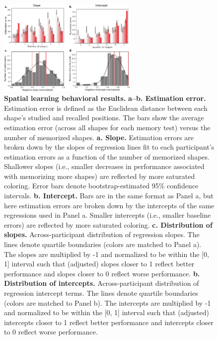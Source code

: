 \documentclass[10pt]{article}
\begin{document}
\begin{figure}[p]
\centering
\includegraphics[width=0.6\textwidth]{figs/spatial_learning_behavior}
\caption{\textbf{Spatial learning behavioral results.}
  \textbf{a--b. Estimation error.}  Estimation
  error is defined as the Euclidean distance between each shape's
  studied and recalled positions.  The bars show the average
  estimation error (across all shapes for each memory test) versus the
  number of memorized shapes.  \textbf{a. Slope.} Estimation errors
  are broken down by the slopes of regression lines fit to each
  participant's estimation errors as a function of the number of
  memorized shapes.  Shallower slopes (i.e., smaller decreases in
  performance associated with memorizing more shapes) are reflected by
  more saturated coloring.  Error bars denote bootstrap-estimated 95\%
  confidence intervals.  \textbf{b. Intercept.}  Bars are in the same
  format as Panel a, but here estimation errors are
  broken down by the intercepts of the same regressions used in Panel
  a.  Smaller intercepts (i.e., smaller baseline errors) are reflected
  by more saturated coloring.  \textbf{c. Distribution of slopes.}
  Across-participant distribution of regression slopes.  The lines
  denote quartile boundaries (colors are matched to Panel a).  The
  slopes are multiplied by -1 and normalized to be within the [0, 1]
  interval such that (adjusted) slopes closer to 1 reflect better
  performance and slopes closer to 0 reflect worse performance.
  \textbf{b. Distribution of intercepts.}  Across-participant
  distribution of regression intercept terms.  The lines denote
  quartile boundaries (colors are matched to Panel b).  The intercepts
  are multiplied by -1 and normalized to be within the [0, 1] interval
  such that (adjusted) intercepts closer to 1 reflect better
  performance and intercepts closer to 0 reflect worse performance.}
\label{fig:spatial_behavioral}
\end{figure}
\end{document}
